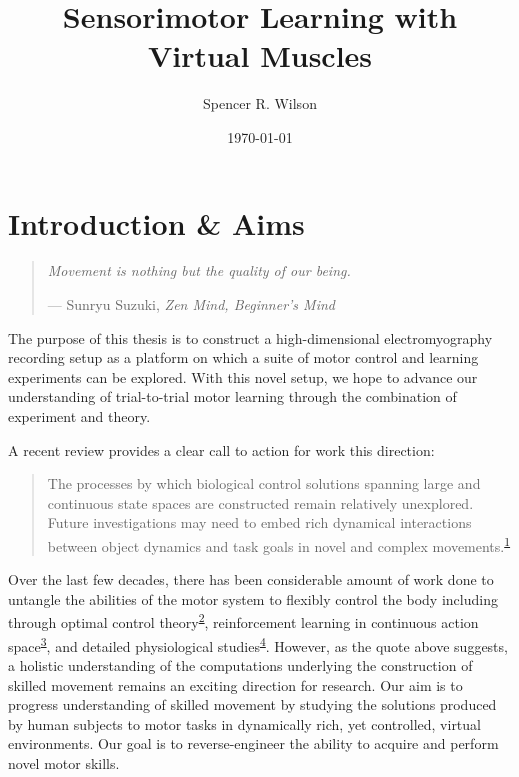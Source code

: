 \documentclass[
  a4paper,
]{article}
\title{Sensorimotor Learning with Virtual Muscles}
\author{Spencer R. Wilson}
\date{\today}
\begin{document}
\maketitle

\hypertarget{sec:intro}{%
\section{Introduction \& Aims}\label{sec:intro}}

\begin{quote}
\emph{Movement is nothing but the quality of our being.}

--- Sunryu Suzuki, \emph{Zen Mind, Beginner's Mind}
\end{quote}

The purpose of this thesis is to construct a high-dimensional
electromyography recording setup as a platform on which a suite of motor
control and learning experiments can be explored. With this novel setup,
we hope to advance our understanding of trial-to-trial motor learning
through the combination of experiment and theory.

A recent review provides a clear call to action for work this direction:

\begin{quote}
The processes by which biological control solutions spanning large and
continuous state spaces are constructed remain relatively unexplored.
Future investigations may need to embed rich dynamical interactions
between object dynamics and task goals in novel and complex
movements.\textsuperscript{\protect\hyperlink{ref-McNamee2019}{1}}
\end{quote}

Over the last few decades, there has been considerable amount of work
done to untangle the abilities of the motor system to flexibly control
the body including through optimal control
theory\textsuperscript{\protect\hyperlink{ref-Todorov2004}{2}},
reinforcement learning in continuous action
space\textsuperscript{\protect\hyperlink{ref-koberReinforcementLearningRobotics2013}{3}},
and detailed physiological
studies\textsuperscript{\protect\hyperlink{ref-sauerbreiCorticalPatternGeneration2019}{4}}.
However, as the quote above suggests, a holistic understanding of the
computations underlying the construction of skilled movement remains an
exciting direction for research. Our aim is to progress understanding of
skilled movement by studying the solutions produced by human subjects to
motor tasks in dynamically rich, yet controlled, virtual environments.
Our goal is to reverse-engineer the ability to acquire and perform novel
motor skills.
\end{document}
